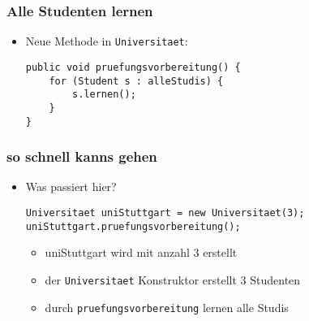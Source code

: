 \documentclass{../../presentation}
\begin{document}
\begin{frame}[fragile]
	\frametitle{Alle Studenten lernen}

	\begin{itemize}
		\item<2-> Neue Methode in \texttt{Universitaet}:
		      \begin{verbatim}
public void pruefungsvorbereitung() {
	for (Student s : alleStudis) {
		s.lernen();
	}
}
\end{verbatim}
	\end{itemize}
\end{frame}
\begin{frame}[fragile]
	\frametitle{so schnell kanns gehen}

	\begin{itemize}
		\item<2-> Was passiert hier?
		      \begin{verbatim}
Universitaet uniStuttgart = new Universitaet(3);
uniStuttgart.pruefungsvorbereitung();
\end{verbatim}
		      \begin{itemize}
			      \item<3->[\textbullet]uniStuttgart wird mit anzahl 3 erstellt
			      \item<4->[\textbullet]der \texttt{Universitaet} Konstruktor erstellt 3 Studenten
			      \item<5->[\textbullet]durch \texttt{pruefungsvorbereitung} lernen alle Studis
		      \end{itemize}
	\end{itemize}
\end{frame}


\end{document}
